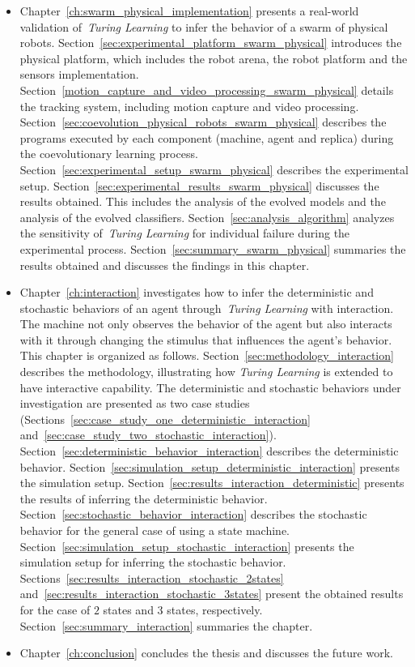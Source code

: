 \begin{itemize}
\item Chapter~\ref{ch:swarm_physical_implementation} presents a real-world validation of~\textit{Turing Learning} to infer the behavior of a swarm of physical robots. Section~\ref{sec:experimental_platform_swarm_physical} introduces the physical platform, which includes the robot arena, the robot platform and the sensors implementation. Section~\ref{motion_capture_and_video_processing_swarm_physical} details the tracking system, including motion capture and video processing. Section~\ref{sec:coevolution_physical_robots_swarm_physical} describes the programs executed by each component (machine, agent and replica) during the coevolutionary learning process. Section~\ref{sec:experimental_setup_swarm_physical} describes the experimental setup. Section~\ref{sec:experimental_results_swarm_physical} discusses the results obtained. This includes the analysis of the evolved models and the analysis of the evolved classifiers. Section~\ref{sec:analysis_algorithm} analyzes the sensitivity of~\textit{Turing Learning} for individual failure during the experimental process. Section~\ref{sec:summary_swarm_physical} summaries the results obtained and discusses the findings in this chapter.

\item Chapter~\ref{ch:interaction} investigates how to infer the deterministic and stochastic behaviors of an agent through~\textit{Turing Learning} with interaction. The machine not only observes the behavior of the agent but also interacts with it through changing the stimulus that influences the agent's behavior. This chapter is organized as follows. Section~\ref{sec:methodology_interaction} describes the methodology, illustrating how \textit{Turing Learning} is extended to have interactive capability. The deterministic and stochastic behaviors under investigation are presented as two case studies (Sections~\ref{sec:case_study_one_deterministic_interaction} and~\ref{sec:case_study_two_stochastic_interaction}). Section~\ref{sec:deterministic_behavior_interaction} describes the deterministic behavior. Section~\ref{sec:simulation_setup_deterministic_interaction} presents the simulation setup. Section~\ref{sec:results_interaction_deterministic} presents the results of inferring the deterministic behavior. Section~\ref{sec:stochastic_behavior_interaction} describes the stochastic behavior for the general case of using a state machine. Section~\ref{sec:simulation_setup_stochastic_interaction} presents the simulation setup for inferring the stochastic behavior. Sections~\ref{sec:results_interaction_stochastic_2states} and~\ref{sec:results_interaction_stochastic_3states} present the obtained results for the case of $2$ states and $3$ states, respectively. Section~\ref{sec:summary_interaction} summaries the chapter.

\item Chapter~\ref{ch:conclusion} concludes the thesis and discusses the future work. 

\end{itemize}
